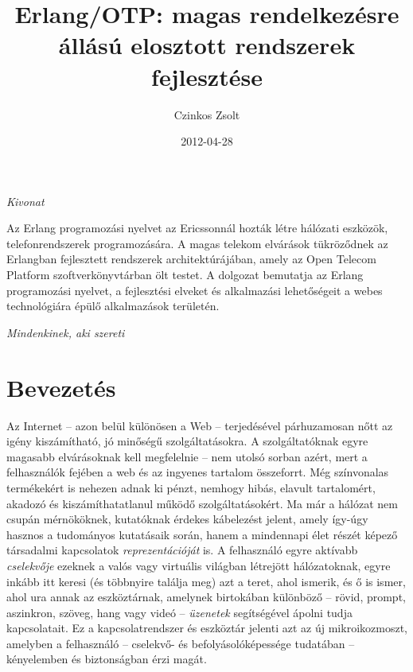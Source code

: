 \documentclass[12pt, a4paper, oneside]{book}
\author{Czinkos Zsolt}
\title{Erlang/OTP: magas rendelkezésre állású elosztott rendszerek fejlesztése}
\date{2012-04-28}
\newenvironment{abstract}
{\newpage \pagestyle{empty} \vspace*{\fill} \begin{center}\em{Kivonat}\end{center}}
{\vspace*{\fill} \newpage}
\begin{document}
\maketitle

\onehalfspacing

\begin{abstract}
Az Erlang programozási nyelvet az Ericssonnál hozták létre hálózati
eszközök, telefonrendszerek programozására. A magas telekom elvárások
tükröződnek az Erlangban fejlesztett rendszerek architektúrájában,
amely az Open Telecom Platform szoftverkönyvtárban ölt testet. A dolgozat
bemutatja az Erlang programozási nyelvet, a fejlesztési elveket és
alkalmazási lehetőségeit a webes technológiára épülő alkalmazások területén.
\end{abstract}

\newpage
\pagestyle{empty}
\vspace*{\fill} 
\hfill \emph{Mindenkinek, aki szereti}
\vspace*{\fill} 
\newpage

\pagestyle{fancy}

\tableofcontents

\chapter{Bevezetés}

Az Internet -- azon belül különösen a Web -- terjedésével párhuzamosan nőtt az
igény kiszámítható, jó minőségű szolgáltatásokra. A szolgáltatóknak egyre
magasabb elvárásoknak kell megfelelnie -- nem utolsó sorban azért, mert a
felhasználók fejében a web és az ingyenes tartalom összeforrt. Még színvonalas
termékekért is nehezen adnak ki pénzt, nemhogy hibás, elavult tartalomért,
akadozó és kiszámíthatatlanul működő szolgáltatásokért. Ma már a hálózat nem
csupán mérnököknek, kutatóknak érdekes kábelezést jelent, amely így-úgy hasznos
a tudományos kutatásaik során, hanem a mindennapi élet részét képező társadalmi
kapcsolatok \textit{reprezentációját} is. A felhasználó egyre aktívabb
\textit{cselekvője} ezeknek a valós vagy virtuális világban létrejött
hálózatoknak, egyre inkább itt keresi (és többnyire találja meg) azt a teret,
ahol ismerik, és ő is ismer, ahol ura annak az eszköztárnak, amelynek
birtokában különböző -- rövid, prompt, aszinkron, szöveg, hang vagy videó --
\textit{üzenetek} segítségével ápolni tudja kapcsolatait. Ez a
kapcsolatrendszer és eszköztár jelenti azt az új mikroikozmoszt, amelyben a
felhasználó -- cselekvő- és befolyásolóképessége tudatában -- kényelemben és
biztonságban érzi magát.
\end{document}
